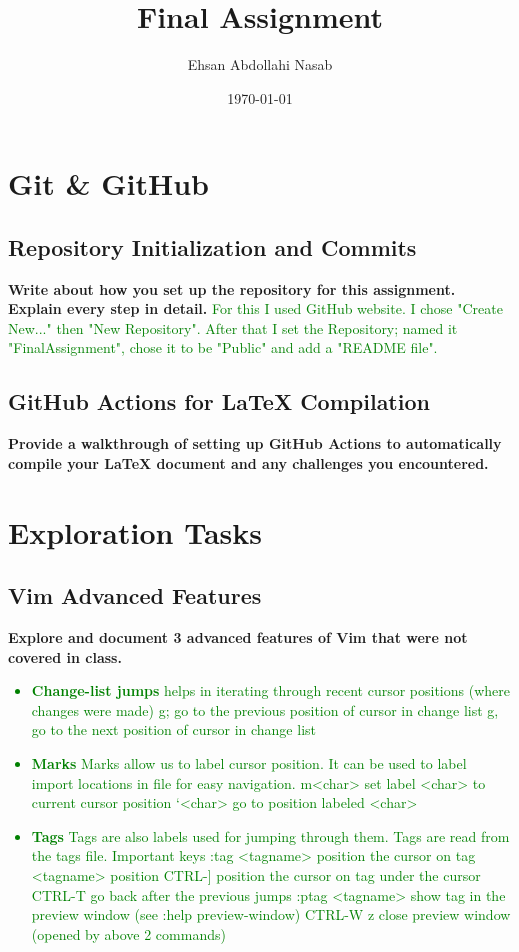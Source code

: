 \documentclass{article}
\title{Final Assignment}
\author{Ehsan Abdollahi Nasab}
\date{\today}
\begin{document}
\maketitle

\section{Git & GitHub}
\subsection{Repository Initialization and Commits}
\textbf{Write about how you set up the repository for this assignment. Explain every step in detail.}
\textcolor{green}{For this I used GitHub website. I chose "Create New..." then "New Repository". After that I set the Repository; named it "FinalAssignment", chose it to be "Public" and add a "README file".}

\subsection{GitHub Actions for LaTeX Compilation}
\textbf{Provide a walkthrough of setting up GitHub Actions to automatically compile your LaTeX document and any challenges you encountered.}
\textcolor{green}{}

\section{Exploration Tasks}
\subsection{Vim Advanced Features}
\textbf{Explore and document 3 advanced features of Vim that were not covered in class.}
\textcolor{green}{\begin{itemize}
    \item \textbf{Change-list jumps} helps in iterating through recent cursor positions (where changes were made)
    g; go to the previous position of cursor in change list
    g, go to the next position of cursor in change list
    \item \textbf{Marks} Marks allow us to label cursor position. It can be used to label import
    locations in file for easy navigation.
    m<char> set label <char> to current cursor position
    ‘<char> go to position labeled <char>
    \item \textbf{Tags} Tags are also labels used for jumping through them. Tags are read from the
    tags file.
    Important keys
    :tag <tagname> position the cursor on tag <tagname> position
    CTRL-] position the cursor on tag under the cursor
    CTRL-T go back after the previous jumps
    :ptag <tagname> show tag in the preview window (see :help preview-window)
    CTRL-W z close preview window (opened by above 2 commands)\end{itemize}
}
\end{document}
